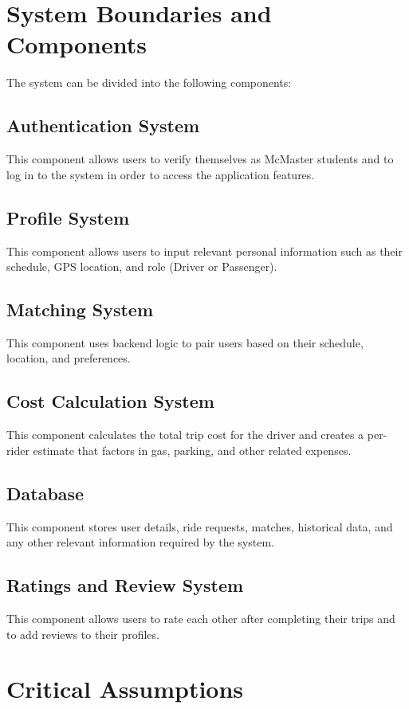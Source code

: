 \documentclass{article}
\begin{document}
\section{System Boundaries and Components}

The system can be divided into the following components:

\subsection{Authentication System}
This component allows users to verify themselves as McMaster students and
 to log in to the system in order to access the application features.

\subsection{Profile System}
This component allows users to input relevant personal information such 
as their schedule, GPS location, and role (Driver or Passenger).

\subsection{Matching System}
This component uses backend logic to pair users based on their schedule, location, 
and preferences.

\subsection{Cost Calculation System}
This component calculates the total trip cost for the driver and creates 
a per-rider estimate that factors in gas, parking, and other related expenses.

\subsection{Database}
This component stores user details, ride requests, matches, historical 
data, and any other relevant information required by the system.

\subsection{Ratings and Review System}
This component allows users to rate each other after completing their 
trips and to add reviews to their profiles.


\section{Critical Assumptions}
\end{document}
